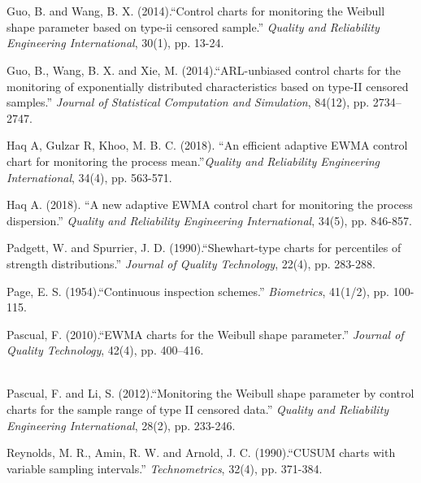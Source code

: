 \documentclass[12pt]{article}  %
\theoremstyle{plain}
\begin{document}
  \section{}
  \begin{enumerate}[{[}1{]}]
   
  \item Guo, B. and Wang, B. X. (2014).“Control charts for monitoring the Weibull shape
parameter based on type-ii censored sample.” \textit{Quality and Reliability Engineering
International}, 30(1), pp. 13-24.

  \item Guo, B., Wang, B. X. and Xie, M. (2014).“ARL-unbiased control charts for the
monitoring of exponentially distributed characteristics based on type-II censored
samples.” \textit{Journal of Statistical Computation and Simulation}, 84(12), pp. 2734–2747. 

  \item Haq A, Gulzar R, Khoo, M. B. C. (2018). “An efficient adaptive EWMA control chart for monitoring the process mean.”\textit{Quality and Reliability Engineering
International}, 34(4), pp. 563-571.


  \item Haq A. (2018). “A new adaptive EWMA control chart for monitoring the process dispersion.” \textit{Quality and Reliability Engineering
International}, 34(5), pp. 846-857.

  \item Padgett, W. and Spurrier, J. D. (1990).“Shewhart-type charts for percentiles of
strength distributions.” \textit{Journal of Quality Technology}, 22(4), pp. 283-288.
  \item Page, E. S. (1954).“Continuous inspection schemes.” \textit{Biometrics}, 41(1/2), pp. 100-115.

  \item Pascual, F. (2010).“EWMA charts for the Weibull shape parameter.” \textit{Journal of
Quality Technology}, 42(4), pp. 400–416.
\\
\\
  \item Pascual, F. and Li, S. (2012).“Monitoring the Weibull shape parameter by control
charts for the sample range of type II censored data.” \textit{Quality and Reliability
Engineering International}, 28(2), pp. 233-246.

  \item Reynolds, M. R., Amin, R. W. and Arnold, J. C. (1990).“CUSUM charts with
variable sampling intervals.” \textit{Technometrics}, 32(4), pp. 371-384.
  

\end{enumerate}
\end{document}
